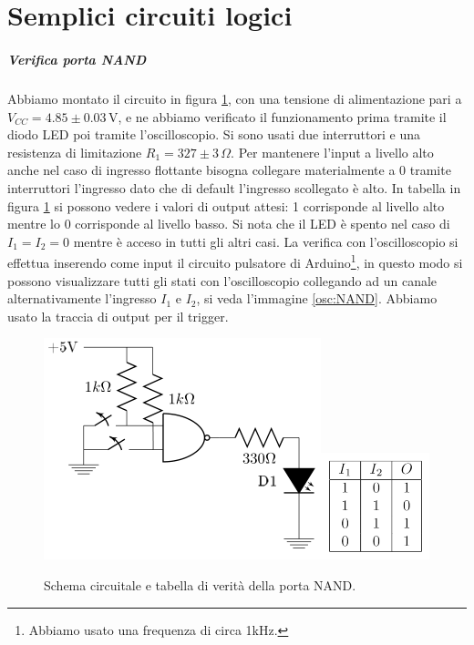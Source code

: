 \documentclass[10pt,a4paper]{article}
\begin{document}
\section{Semplici circuiti logici}
\subparagraph{Verifica porta NAND}
Abbiamo montato il circuito in figura \ref{fig:NAND}, con una tensione di alimentazione pari a $V_{CC}= 4.85\pm0.03\,\text{V}$, e ne abbiamo verificato il funzionamento prima tramite il diodo LED poi tramite l'oscilloscopio. Si sono usati due interruttori e una resistenza di limitazione $R_1=327\pm3\,\Omega$. Per mantenere l'input a livello alto anche nel caso di ingresso flottante bisogna collegare materialmente a 0 tramite interruttori l'ingresso dato che di default l'ingresso scollegato è alto. In tabella in figura \ref{fig:NAND} si possono vedere i valori di output attesi: 1 corrisponde al livello alto mentre lo 0 corrisponde al livello basso. Si nota che il LED è spento nel caso di $I_1=I_2=0$ mentre è acceso in tutti gli altri casi. La verifica con l'oscilloscopio si effettua inserendo come input il circuito pulsatore di Arduino\footnote{Abbiamo usato una frequenza di circa 1kHz.}, in questo modo si possono visualizzare tutti gli stati con l'oscilloscopio collegando ad un canale alternativamente l'ingresso $I_1$ e $I_2$, si veda l'immagine \ref{osc:NAND}. Abbiamo usato la traccia di output per il trigger.\\


\begin{figure}[!htb]
  \centering
  \includegraphics[scale=0.8]{nand.png}\includegraphics[scale=0.9]{tabNAND.png}
\caption{Schema circuitale e tabella di verità della porta NAND.\label{fig:NAND}}
\end{figure}
\end{document}

